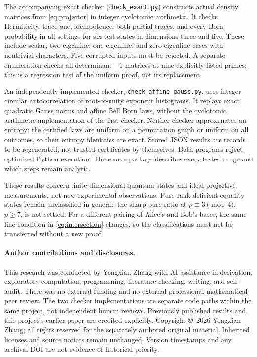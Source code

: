 \documentclass[11pt]{article}
\theoremstyle{remark}\newtheorem{remark}[theorem]{Remark}
\begin{document}
The accompanying exact checker (\texttt{check\_exact.py}) constructs actual density matrices from \eqref{eq:projector} in integer cyclotomic arithmetic. It checks Hermiticity, trace one, idempotence, both partial traces, and every Born probability in all settings for six test states in dimensions three and five. These include scalar, two-eigenline, one-eigenline, and zero-eigenline cases with nontrivial characters. Five corrupted inputs must be rejected. A separate enumeration checks all determinant-$-1$ matrices at nine explicitly listed primes; this is a regression test of the uniform proof, not its replacement.

An independently implemented checker, \texttt{check\_affine\_gauss.py}, uses integer circular autocorrelation of root-of-unity exponent histograms. It replays exact quadratic Gauss norms and affine Bell Born laws, without the cyclotomic arithmetic implementation of the first checker. Neither checker approximates an entropy: the certified laws are uniform on a permutation graph or uniform on all outcomes, so their entropy identities are exact. Stored JSON results are records to be regenerated, not trusted certificates by themselves. Both programs reject optimized Python execution. The source package describes every tested range and which steps remain analytic.

These results concern finite-dimensional quantum states and ideal projective measurements, not new experimental observations. Pure rank-deficient equality states remain unclassified in general; the sharp pure ratio at $p\equiv3\pmod4$, $p\ge7$, is not settled. For a different pairing of Alice's and Bob's bases, the same-line condition in \eqref{eq:intersection} changes, so the classifications must not be transferred without a new proof.

\paragraph{Author contributions and disclosures.}
This research was conducted by Yongxian Zhang with AI assistance in derivation, exploratory computation, programming, literature checking, writing, and self-audit. There was no external funding and no external professional mathematical peer review. The two checker implementations are separate code paths within the same project, not independent human reviews. Previously published results and this project's earlier paper are credited explicitly. Copyright \copyright\ 2026 Yongxian Zhang; all rights reserved for the separately authored original material. Inherited licenses and source notices remain unchanged. Version timestamps and any archival DOI are not evidence of historical priority.
\end{document}
